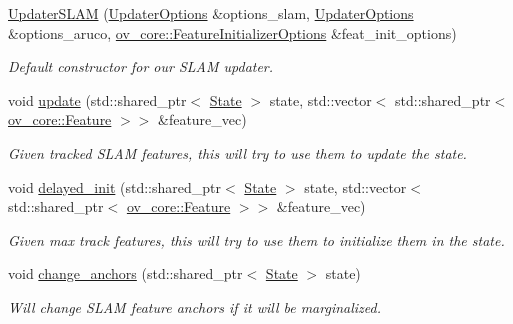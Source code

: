 \begin{DoxyCompactItemize}
\item 
\hyperlink{classov__msckf_1_1UpdaterSLAM_a24185ab7a42cea66b9361ebf991e9548}{Updater\+S\+L\+AM} (\hyperlink{structov__msckf_1_1UpdaterOptions}{Updater\+Options} \&options\+\_\+slam, \hyperlink{structov__msckf_1_1UpdaterOptions}{Updater\+Options} \&options\+\_\+aruco, \hyperlink{structov__core_1_1FeatureInitializerOptions}{ov\+\_\+core\+::\+Feature\+Initializer\+Options} \&feat\+\_\+init\+\_\+options)
\begin{DoxyCompactList}\small\item\em Default constructor for our S\+L\+AM updater. \end{DoxyCompactList}\item 
void \hyperlink{classov__msckf_1_1UpdaterSLAM_a327bcedfea68fe301dc37e1f08d562e6}{update} (std\+::shared\+\_\+ptr$<$ \hyperlink{classov__msckf_1_1State}{State} $>$ state, std\+::vector$<$ std\+::shared\+\_\+ptr$<$ \hyperlink{classov__core_1_1Feature}{ov\+\_\+core\+::\+Feature} $>$$>$ \&feature\+\_\+vec)
\begin{DoxyCompactList}\small\item\em Given tracked S\+L\+AM features, this will try to use them to update the state. \end{DoxyCompactList}\item 
void \hyperlink{classov__msckf_1_1UpdaterSLAM_a4ef14978d06b4386672fe56c3a844fda}{delayed\+\_\+init} (std\+::shared\+\_\+ptr$<$ \hyperlink{classov__msckf_1_1State}{State} $>$ state, std\+::vector$<$ std\+::shared\+\_\+ptr$<$ \hyperlink{classov__core_1_1Feature}{ov\+\_\+core\+::\+Feature} $>$$>$ \&feature\+\_\+vec)
\begin{DoxyCompactList}\small\item\em Given max track features, this will try to use them to initialize them in the state. \end{DoxyCompactList}\item 
void \hyperlink{classov__msckf_1_1UpdaterSLAM_ae85d162f1a93f1dbed1a60b2fdd26870}{change\+\_\+anchors} (std\+::shared\+\_\+ptr$<$ \hyperlink{classov__msckf_1_1State}{State} $>$ state)
\begin{DoxyCompactList}\small\item\em Will change S\+L\+AM feature anchors if it will be marginalized. \end{DoxyCompactList}\end{DoxyCompactItemize}
